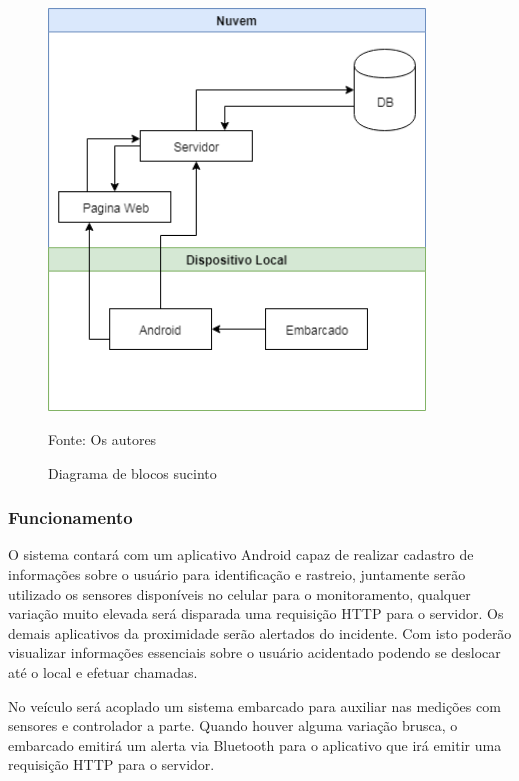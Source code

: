  \begin{figure}[H]



\begin{center}
     \caption{Diagrama de blocos sucinto }
  \includegraphics[width=100mm]{images/Cap3/Diagrama_de_blocos.png}
\end{center}
Fonte: Os autores

  
\end{figure}

    

\subsubsection{Funcionamento}

O sistema contará com um aplicativo Android capaz de realizar cadastro de informações sobre o usuário para identificação e rastreio, juntamente serão utilizado os sensores disponíveis no celular para o monitoramento, qualquer variação muito elevada será disparada uma requisição HTTP para o servidor. Os demais aplicativos da proximidade serão alertados do incidente. Com isto poderão visualizar informações essenciais sobre o usuário acidentado podendo se deslocar até o local e efetuar chamadas.

No veículo será acoplado um sistema embarcado para auxiliar nas medições com sensores e controlador a parte. Quando houver alguma variação brusca, o embarcado emitirá um alerta via Bluetooth para o aplicativo que irá emitir uma requisição HTTP para o servidor.

